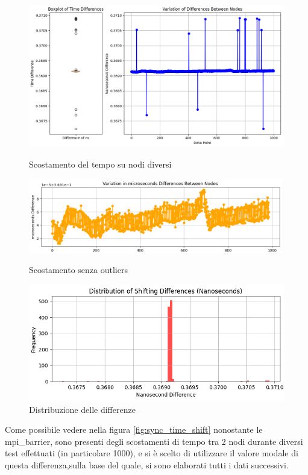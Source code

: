 \begin{figure}[H]
    \centering
    \includegraphics[width=\textwidth]{./results/time_sync_node.png}
    \caption{Scostamento del tempo su nodi diversi}
    \label{fig:sync_time_shift}
    \includegraphics[width=0.99\textwidth]{./results/time_shift_clean.png}
    \caption{Scostamento senza outliers}
    \label{fig:sync_diff_distr}
    \includegraphics[width=\textwidth]{./results/time_sync_distribution.png}
    \caption{Distribuzione delle differenze}
    \label{fig:sync_diff_distr}
\end{figure}

Come possibile vedere nella figura \ref{fig:sync_time_shift} nonostante le mpi\_barrier, sono presenti degli scostamenti di tempo tra 2 nodi durante diversi test effettuati (in particolare 1000), e si è scelto di utilizzare il valore modale di questa differenza,sulla base del quale, si sono elaborati tutti i dati successivi.

